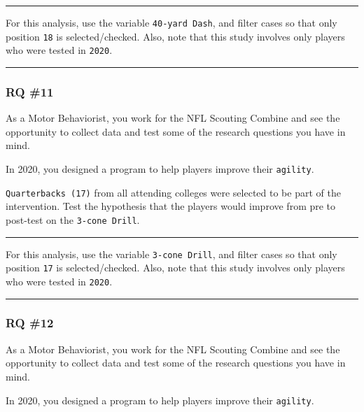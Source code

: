 \documentclass[
]{article}
\begin{document}
\begin{center}\rule{0.5\linewidth}{0.5pt}\end{center}

For this analysis, use the variable \texttt{40-yard\ Dash}, and filter cases so that only position \texttt{18} is selected/checked. Also, note that this study involves only players who were tested in \texttt{2020}.

\begin{center}\rule{0.5\linewidth}{0.5pt}\end{center}

\hypertarget{rq-11}{%
\subsubsection{RQ \#11}\label{rq-11}}

As a Motor Behaviorist, you work for the NFL Scouting Combine and see the opportunity to collect data and test some of the research questions you have in mind.

In 2020, you designed a program to help players improve their \texttt{agility}.

\texttt{Quarterbacks\ (17)} from all attending colleges were selected to be part of the intervention. Test the hypothesis that the players would improve from pre to post-test on the \texttt{3-cone\ Drill}.

\begin{center}\rule{0.5\linewidth}{0.5pt}\end{center}

For this analysis, use the variable \texttt{3-cone\ Drill}, and filter cases so that only position \texttt{17} is selected/checked. Also, note that this study involves only players who were tested in \texttt{2020}.

\begin{center}\rule{0.5\linewidth}{0.5pt}\end{center}

\hypertarget{rq-12}{%
\subsubsection{RQ \#12}\label{rq-12}}

As a Motor Behaviorist, you work for the NFL Scouting Combine and see the opportunity to collect data and test some of the research questions you have in mind.

In 2020, you designed a program to help players improve their \texttt{agility}.
\end{document}
